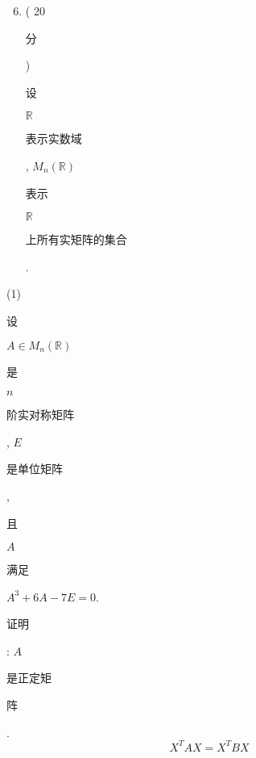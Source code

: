 \documentclass[10pt]{article}
\begin{document}
\begin{enumerate}
  \setcounter{enumi}{5}
  \item ( 20 \begin{CJK}{UTF8}{mj}分\end{CJK}) \begin{CJK}{UTF8}{mj}设\end{CJK} $\mathbb{R}$ \begin{CJK}{UTF8}{mj}表示实数域\end{CJK}, $M_{n}(\mathbb{R})$ \begin{CJK}{UTF8}{mj}表示\end{CJK} $\mathbb{R}$ \begin{CJK}{UTF8}{mj}上所有实矩阵的集合\end{CJK}.
\end{enumerate}
(1) \begin{CJK}{UTF8}{mj}设\end{CJK} $A \in M_{n}(\mathbb{R})$ \begin{CJK}{UTF8}{mj}是\end{CJK} $n$ \begin{CJK}{UTF8}{mj}阶实对称矩阵\end{CJK}, $E$ \begin{CJK}{UTF8}{mj}是单位矩阵\end{CJK}, \begin{CJK}{UTF8}{mj}且\end{CJK} $A$ \begin{CJK}{UTF8}{mj}满足\end{CJK} $A^{3}+6 A-7 E=0$. \begin{CJK}{UTF8}{mj}证明\end{CJK}: $A$ \begin{CJK}{UTF8}{mj}是正定矩\end{CJK} \begin{CJK}{UTF8}{mj}阵\end{CJK}.
$$
X^{T} A X=X^{T} B X
$$
\end{document}

